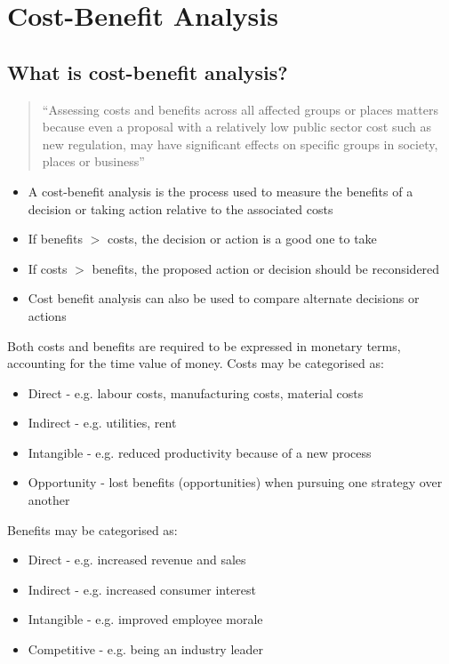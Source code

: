 \chapter{Cost-Benefit Analysis}
\section{What is cost-benefit analysis?}
\begin{quote}
  ``Assessing costs and benefits across all affected groups or places matters because even a proposal with a relatively low public sector cost such as new regulation, may have significant effects on specific groups in society, places or business''
\end{quote}
\begin{itemize}
  \item A cost-benefit analysis is the process used to measure the benefits of a decision or taking action relative to the associated costs
  \item If benefits $>$ costs, the decision or action is a good one to take
  \item If costs $>$ benefits, the proposed action or decision should be reconsidered
  \item Cost benefit analysis can also be used to compare alternate decisions or actions
\end{itemize}
Both costs and benefits are required to be expressed in monetary terms, accounting for the time value of money. Costs may be categorised as:
\begin{itemize}
  \item Direct - e.g. labour costs, manufacturing costs, material costs
  \item Indirect - e.g. utilities, rent
  \item Intangible - e.g. reduced productivity because of a new process
  \item Opportunity - lost benefits (opportunities) when pursuing one strategy over another
\end{itemize}
Benefits may be categorised as:
\begin{itemize}
  \item Direct - e.g. increased revenue and sales
  \item Indirect - e.g. increased consumer interest
  \item Intangible - e.g. improved employee morale
  \item Competitive - e.g. being an industry leader
\end{itemize}
